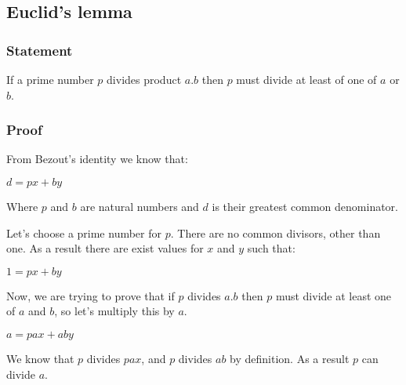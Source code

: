 
\subsection{Euclid's lemma}

\subsubsection{Statement}

If a prime number \(p\) divides product \(a.b\) then \(p\) must divide at least of one of \(a\) or \(b\).

\subsubsection{Proof}

From Bezout's identity we know that:

$d=px+by$

Where \(p\) and \(b\) are natural numbers and \(d\) is their greatest common denominator.

Let's choose a prime number for \(p\). There are no common divisors, other than one. As a result there are exist values for \(x\) and \(y\) such that:

$1=px+by$

Now, we are trying to prove that if \(p\) divides \(a.b\) then \(p\) must divide at least one of \(a\) and \(b\), so let's multiply this by \(a\).

$a=pax+aby$

We know that \(p\) divides \(pax\), and \(p\) divides \(ab\) by definition. As a result \(p\) can divide \(a\).

